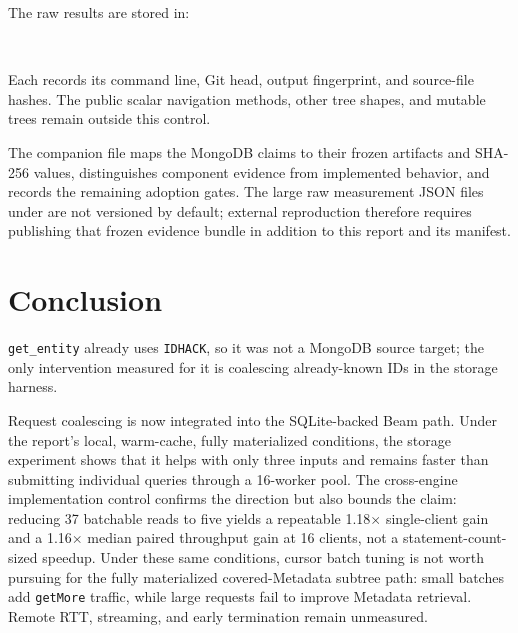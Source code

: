 \documentclass[10pt]{article}
\newcommand{\code}[1]{\texttt{#1}}
\begin{document}
The raw results are stored in:
\begin{center}
\small
{}\\
\end{center}
Each records its command line, Git head, output fingerprint, and source-file
hashes. The public scalar navigation methods, other tree shapes, and mutable
trees remain outside this control.

The companion file
 maps the MongoDB claims to
their frozen artifacts and SHA-256 values, distinguishes component evidence from
implemented behavior, and records the remaining adoption gates. The large raw
measurement JSON files under  are not versioned by default;
external reproduction therefore requires publishing that frozen evidence bundle
in addition to this report and its manifest.

\section{Conclusion}

\code{get\_entity} already uses \code{IDHACK}, so it was not a MongoDB
source target; the only intervention measured for it is coalescing
already-known IDs in the storage harness.

Request coalescing is now integrated into the SQLite-backed Beam path. Under
the report's local, warm-cache, fully materialized conditions, the storage
experiment shows that it helps with only three inputs and remains faster than
submitting individual queries through a 16-worker pool. The cross-engine
implementation control confirms the direction but also bounds the claim:
reducing 37 batchable reads to five yields a repeatable
1.18$\times$ single-client gain and a 1.16$\times$ median paired throughput
gain at 16 clients, not a statement-count-sized speedup. Under these same
conditions, cursor batch tuning is not worth pursuing for the fully
materialized covered-Metadata subtree path: small batches add \code{getMore}
traffic, while large requests fail to improve Metadata retrieval. Remote RTT,
streaming, and early termination remain unmeasured.
\end{document}
